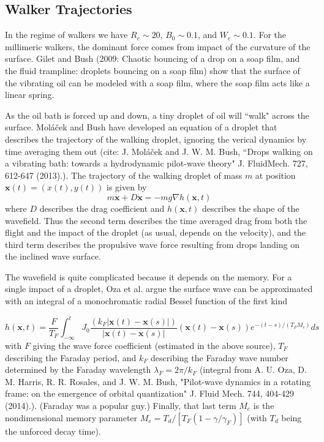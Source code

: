 \subsection{Walker Trajectories}
In the regime of walkers we have $R_e \sim 20$, $B_0 \sim 0.1$, and $W_e \sim 0.1$. For the millimeric walkers, the dominant force comes from impact of the curvature of the surface. Gilet and Bush (2009: Chaotic bouncing of a drop on a soap film, and the fluid trampline: droplets bouncing on a soap film) show that the surface of the vibrating oil can be modeled with a soap film, where the soap film acts like a linear spring. 

As the oil bath is forced up and down, a tiny droplet of oil will ``walk" across the surface. Mol\'{a}\v{c}ek and Bush have developed an equation of a droplet that describes the trajectory of the walking droplet, ignoring the verical dynamics by time averaging them out (cite: J. Mol\'{a}\v{c}ek and J. W. M. Bush, ``Drops walking on a vibrating bath: towards a hydrodynamic pilot-wave theory" J. FluidMech. 727, 612-647 (2013).). The trajectory of the walking droplet of mass $m$ at position $\textbf{x}(t) = (x(t),y(t))$ is given by
\begin{equation}
m \ddot{\textbf{x}} + D \dot{\textbf{x}} = -mg\nabla h(\textbf{x},t) 
\end{equation}
where $D$ describes the drag coefficient and $h(\textbf{x},t)$ describes the shape of the wavefield. Thus the second term describes the time averaged drag from both the flight and the impact of the droplet (as usual, depends on the velocity), and the third term describes the propulsive wave force resulting from drops landing on the inclined wave surface. 

The wavefield is quite complicated because it depends on the memory. For a single impact of a droplet, Oza et al. argue the surface wave can be approximated with an integral of a monochromatic radial Bessel function of the first kind

\begin{equation}
h(\textbf{x},t) = \frac{F}{T_F} \int_{-\infty}^{t} J_0 \frac{(k_F |\textbf{x}(t)-\textbf{x}(s)|)}{|\textbf{x}(t)-\textbf{x}(s)|} (\textbf{x}(t)-\textbf{x}(s))e^{-(t-s)/(T_F M_e)} ds
\end{equation}
with $F$ giving the wave force coefficient (estimated in the above source), $T_F$ describing the Faraday period, and $k_F$ describing the Faraday wave number determined by the Faraday wavelength $\lambda_F = 2π/k_F$ (integral from A. U. Oza, D. M. Harris, R. R. Rosales, and J. W. M. Bush, "Pilot-wave dynamics in a rotating frame: on the emergence of orbital quantization" J. Fluid Mech. 744, 404-429 (2014).). (Faraday was a popular guy.) Finally, that last term $M_e$ is the nondimensional memory parameter $M_e = T_d/[T_F(1-\gamma / \gamma_F)]$ (with $T_d$ being the unforced decay time).

